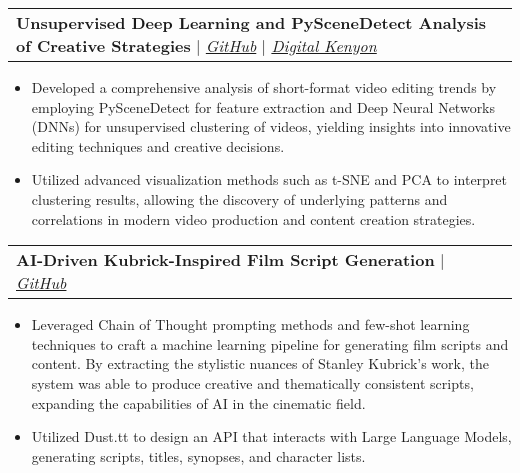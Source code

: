 \documentclass[letterpaper,11pt]{article}
\makeatletter
\newcommand{\resumeItem}[1]{
  \item\small{
    {#1 \vspace{-2pt}}
  }
}
\newcommand{\resumeProjectHeading}[2]{
    \vspace{-2pt}\item
    \begin{tabular*}{0.97\textwidth}{l@{\extracolsep{\fill}}r}
      \small#1 & #2 \\
    \end{tabular*}\vspace{-7pt}
}
\newcommand{\resumeItemListStart}{\begin{itemize}}
\newcommand{\resumeItemListEnd}{\end{itemize}\vspace{-5pt}}
\makeatother
\begin{document}
      \resumeProjectHeading
        {\textbf{Unsupervised Deep Learning and PySceneDetect Analysis of Creative Strategies} $|$ \emph{\href{https://github.com/raulduk3/pySceneDetect-video-editing-trends}{\color{blue}GitHub}} $|$ \emph{\href{https://digital.kenyon.edu/dh_iphs_ss/22/}{\color{blue}Digital Kenyon}}}{}
	 \resumeItemListStart
			\resumeItem{Developed a comprehensive analysis of short-format video editing trends by employing PySceneDetect for feature extraction and Deep Neural Networks (DNNs) for unsupervised clustering of videos, yielding insights into innovative editing techniques and creative decisions.}
			\resumeItem{Utilized advanced visualization methods such as t-SNE and PCA to interpret clustering results, allowing the discovery of underlying patterns and correlations in modern video production and content creation strategies.}
	\resumeItemListEnd
	
	\resumeProjectHeading
        {\textbf{AI-Driven Kubrick-Inspired Film Script Generation} $|$ \emph{\href{https://github.com/raulduk3/kubrick-gen}{\color{blue}GitHub}}}{}
         \resumeItemListStart
			\resumeItem{Leveraged Chain of Thought prompting methods and few-shot learning techniques to craft a machine learning pipeline for generating film scripts and content. By extracting the stylistic nuances of Stanley Kubrick's work, the system was able to produce creative and thematically consistent scripts, expanding the capabilities of AI in the cinematic field.}
			\resumeItem{Utilized Dust.tt to design an API that interacts with Large Language Models, generating scripts, titles, synopses, and character lists. }

          \resumeItemListEnd


 
      
          
\end{document}
